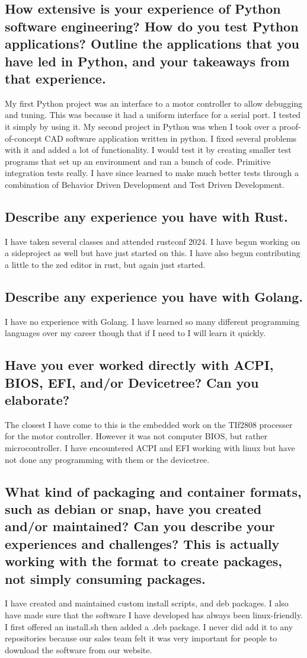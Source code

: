 \documentclass[letter,12pt]{article}
\begin{document}
\subsection{How extensive is your experience of Python software engineering? How do you test Python applications? Outline the applications that you have led in Python, and your takeaways from that experience.}
My first Python project was an interface to a motor controller to allow debugging and tuning. This was because it had a uniform interface for a serial port. I tested it simply by using it. My second project in Python was when I took over a proof-of-concept CAD software application written in python. I fixed several problems with it and added a lot of functionality. I would test it by creating smaller test programs that set up an environment and ran a bunch of code. Primitive integration tests really. I have since learned to make much better tests through a combination of Behavior Driven Development and Test Driven Development.

\subsection{Describe any experience you have with Rust.}
I have taken several classes and attended rustconf 2024. I have begun working on a sideproject as well but have just started on this. I have also begun contributing a little to the zed editor in rust, but again just started.

\subsection{Describe any experience you have with Golang.}
I have no experience with Golang. I have learned so many different programming languages over my career though that if I need to I will learn it quickly.

\subsection{Have you ever worked directly with ACPI, BIOS, EFI, and/or Devicetree? Can you elaborate?}
The closest I have come to this is the embedded work on the TIf2808 processer for the motor controller. However it was not computer BIOS, but rather microcontroller. I have encountered ACPI and EFI working with linux but have not done any programming with them or the devicetree.

\subsection{What kind of packaging and container formats, such as debian or snap, have you created and/or maintained? Can you describe your experiences and challenges? This is actually working with the format to create packages, not simply consuming packages.}
I have created and maintained custom install scripts, and deb packages. I also have made sure that the software I have developed has always been linux-friendly. I first offered an install.sh then added a .deb package. I never did add it to any repositories because our sales team felt it was very important for people to download the software from our website.
\end{document}
